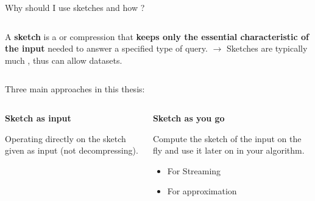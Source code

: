 \documentclass[aspectratio=169]{beamer}
\begin{document}
\begin{frame}{Why should I use sketches and how ?}
    \begin{columns}
        \small{A \textbf{sketch} is a  or  compression that \textbf{keeps only the essential characteristic of the input} needed to answer a specified type of query.}
        \LARGE{$\rightarrow$}
            \small{
            Sketches are typically much , thus can allow  datasets.}
    \end{columns}
    \bigskip
    \pause


    \hspace{-0.5cm} {\large \textcolor{black!30!blue}{Three main approaches in this thesis:}}
    \begin{columns}
        \begin{framed}
            \begin{center}
                \textbf{Sketch as input}
            \end{center}
            Operating directly on the sketch given as input (not decompressing).
        \end{framed}
        \begin{framed}
            \begin{center}
                \textbf{Sketch as you go}
            \end{center}
            Compute the sketch of the input on the fly and use it later on in your algorithm. 
            \begin{itemize}
                \item For Streaming
                \item For approximation
            \end{itemize}
        \end{framed}
    \end{columns}
\end{frame}
\end{document}
